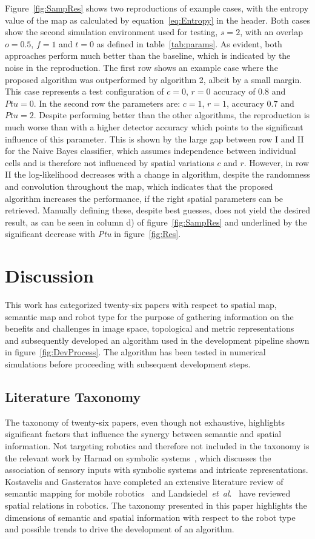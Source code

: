 \documentclass[twocolumn,letterpaper]{IEEEAerospaceCLS}  %
\newcommand{\abbreviation}[1]{\emph{#1}.}
\newcommand{\etal}{\abbreviation{et~al}}
\begin{document}
Figure~\ref{fig:SampRes} shows two reproductions of example cases, with the entropy value of the map as calculated by equation~\ref{eq:Entropy} in the header. Both cases show the second simulation environment used for testing, $s = 2$, with an overlap $o = 0.5$, $f = 1$ and $t= 0 $ as defined in table~\ref{tab:params}. As evident, both approaches perform much better than the baseline, which is indicated by the noise in the reproduction. The first row shows an example case where the proposed algorithm was outperformed by algorithm 2, albeit by a small margin. This case represents a test configuration of $c = 0$, $r = 0$ accuracy of $0.8$ and $Ptu = 0$.  In the second row the parameters are: $c =1$, $r = 1$, accuracy $0.7$ and $Ptu = 2$.
Despite performing better than the other algorithms, the reproduction is much worse than with a higher detector accuracy which points to the significant influence of this parameter. This is shown by the large gap between row I and II for the Naive Bayes classifier, which assumes independence between individual cells and is therefore not influenced by spatial variations $c$ and $r$. However, in row II the log-likelihood decreases with a change in algorithm, despite the randomness and convolution throughout the map, which indicates that the proposed algorithm increases the performance, if the right spatial parameters can be retrieved. Manually defining these, despite best guesses, does not yield the desired result, as can be seen in column d) of figure~\ref{fig:SampRes} and underlined by the significant decrease with \emph{Ptu} in figure~\ref{fig:Res}.
\section{Discussion} \label{sec:Disc}
This work has categorized twenty-six papers with respect to spatial map, semantic map and robot type for the purpose of gathering information on the benefits and challenges in image space, topological and metric representations and subsequently developed an algorithm used in the development pipeline shown in figure~\ref{fig:DevProcess}. The algorithm has been tested in numerical simulations before proceeding with subsequent development steps.
\subsection{Literature Taxonomy} \label{ssec:DiscLit}
The taxonomy of twenty-six papers, even though not exhaustive, highlights significant factors that influence the synergy between semantic and spatial information. Not targeting robotics and therefore not included in the taxonomy is the relevant work by Harnad on symbolic systems~\cite{harnad_symbol_1990}, which discusses the association of sensory inputs with symbolic systems and intricate representations. Kostavelis and Gasteratos have completed an extensive literature review of semantic mapping for mobile robotics~\cite{kostavelis_semantic_2015} and Landsiedel~\etal~\cite{landsiedel_review_2017} have reviewed spatial relations in robotics. The taxonomy presented in this paper highlights the dimensions of semantic and spatial information with respect to the robot type and possible trends to drive the development of an algorithm.
\end{document}
